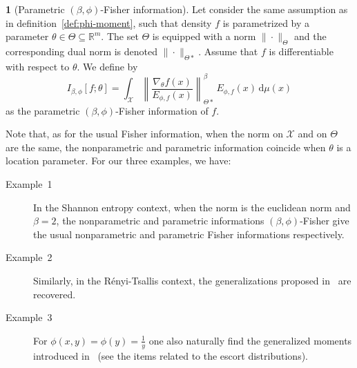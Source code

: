 \documentclass[english,sort&compress]{elsarticle}
\theoremstyle{definition}
\newtheorem{defn}{\protect\definitionname}
\theoremstyle{plain}
\theoremstyle{plain}
\providecommand{\definitionname}{Definition}
\def\dmu{\mathrm{d}\mu}
\def\Rset{\mathbb{R}}
\def\X{\mathcal{X}}
\begin{document}
\begin{defn}[Parametric $(\beta,\phi)$-Fisher information]\label{def:p-phi-Fisher}
  Let consider  the same assumption as  in definition~\ref{def:phi-moment}, such
  that density $f$  is parametrized by a parameter $\theta  \in \Theta \subseteq
  \Rset^m$.  The set $\Theta$ is equipped with a norm $\| \cdot \|_{\Theta}$ and
  the corresponding dual  norm is denoted $\| \cdot  \|_{\Theta*}$.  Assume that
  $f$ is differentiable with respect to $\theta$. We define by
  \begin{equation}\label{eq:p-phi-Fisher}
  I_{\beta,\phi}[f;\theta] = \int_\X \left\| \frac{\nabla_\theta
  f(x)}{E_{\phi,f}(x)} \right\|_{\Theta*}^\beta \, E_{\phi,f}(x) \, \dmu(x)
  \end{equation}
  as the parametric $(\beta,\phi)$-Fisher information of $f$.
\end{defn}
%
Note that,  as for the usual  Fisher information, when  the norm on $\X$  and on
$\Theta$  are the same,  the nonparametric  and parametric  information coincide
when $\theta$  is a location  parameter. For our three examples, we have:
%
\begin{description}%
\item[Example~1]    In   the  Shannon entropy
context, when the norm is the  euclidean norm and $\beta = 2$, the nonparametric
and parametric  informations $(\beta,\phi)$-Fisher give  the usual nonparametric
and   parametric   Fisher   informations   respectively.
%
\item[Example~2] Similarly, in  the R\'enyi-Tsallis context, the generalizations
  proposed in~\cite{Ber12:06_1, Ber12:06_2, Ber13} are recovered.
%
\item[Example~3] For $\phi(x,y) = \phi(y) = \frac{1}{y}$ one also naturally find
  the generalized moments introduced in~\cite{TsaMen98, MarNic00} (see the items
  related to the escort distributions). 
\end{description}



\
\end{document}
